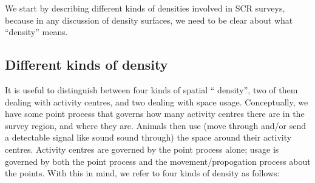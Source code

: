 \documentclass[10pt,a4paper]{article}
\begin{document}
We start by describing different kinds of densities involved in SCR surveys, because in any discussion of density surfaces, we need to be clear about what ``density'' means. %



\subsection{Different kinds of density}

It is useful to distinguish between four kinds of spatial `` density'', two of them dealing with activity centres, and two dealing with space usage. Conceptually, we have some point process that governs how many activity centres there are in the survey region, and where they are. Animals then use (move through and/or send a detectable signal like sound sound through) the space around their activity centres. Activity centres are governed by the point process alone; usage is governed by both the point process and the movement/propogation process about the points. With this in mind, we refer to four kinds of density as follows:
\end{document}
